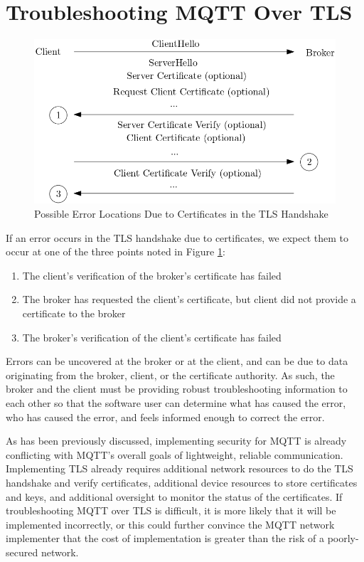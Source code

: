 \documentclass[12pt]{article}
\begin{document}
\section{Troubleshooting MQTT Over TLS}
\begin{figure}[!htb]
\centering
	\includegraphics[scale=0.5]{tls-handshake.png}
	\caption{Possible Error Locations Due to Certificates in the TLS Handshake\label{fig:handshake}}
\end{figure}
If an error occurs in the TLS handshake due to certificates, we expect them to occur at one of the three points noted in Figure \ref{fig:handshake}:
\begin{enumerate}
	\item The client's verification of the broker's certificate has failed
	\item The broker has requested the client's certificate, but client did not provide a certificate to the broker
	\item The broker's verification of the client's certificate has failed
\end{enumerate}
Errors can be uncovered at the broker or at the client, and can be due to data originating from the broker, client, or the certificate authority. As such, the broker and the client must be providing robust troubleshooting information to each other so that the software user can determine what has caused the error, who has caused the error, and feels informed enough to correct the error.\par
As has been previously discussed, implementing security for MQTT is already conflicting with MQTT's overall goals of lightweight, reliable communication. Implementing TLS already requires additional network resources to do the TLS handshake and verify certificates, additional device resources to store certificates and keys, and additional oversight to monitor the status of the certificates. If troubleshooting MQTT over TLS is difficult, it is more likely that it will be implemented incorrectly, or this could further convince the MQTT network implementer that the cost of implementation is greater than the risk of a poorly-secured network.
\end{document}
